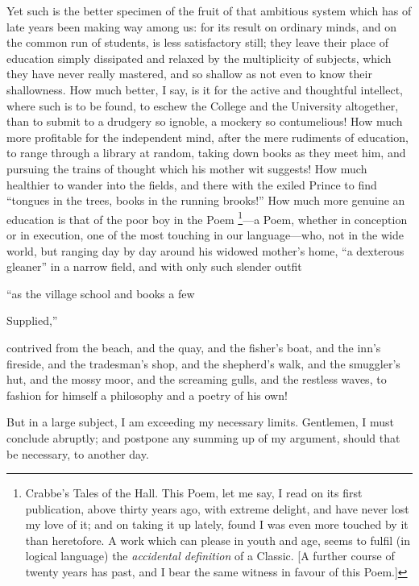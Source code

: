 Yet such is the better specimen of the fruit of that ambitious
system which has of late years been making way among us: for its
result on ordinary minds, and on the common run of students, is less
satisfactory still; they leave their place of education simply
dissipated and relaxed by the multiplicity of subjects, which they
have never really mastered, and so shallow as not even to know their
shallowness. How much better, I say, is it for the active and
thoughtful intellect, where such is to be found, to eschew the College
and the University altogether, than to submit to a drudgery so
ignoble, a mockery so contumelious! How much more profitable for the
independent mind, after the mere rudiments of education, to range
through a library at random, taking down books as they meet him,
and pursuing the trains of thought which his mother wit suggests! How
much healthier to wander into the fields, and there with the exiled
Prince to find ``tongues in the trees, books in the running
brooks!'' How much more genuine an education is that of the poor
boy in the Poem \footnote{Crabbe's Tales
of the Hall. This Poem, let me say, I read on its first publication,
above thirty years ago, with extreme delight, and have never lost my
love of it; and on taking it up lately, found I was even more touched
by it than heretofore. A work which can please in youth and age, seems
to fulfil (in logical language) the \emph{accidental definition} of a
Classic. [A further course of twenty years has past, and I bear the
same witness in favour of this Poem.]}—a Poem, whether in conception or in execution, one of the
most touching in our language—who, not in the wide world, but
ranging day by day around his widowed mother's home, ``a dexterous
gleaner'' in a narrow field, and with only such slender outfit

``as the village school and books a few

Supplied,''

contrived from the beach, and the quay, and the fisher's boat, and
the inn's fireside, and the tradesman's shop, and the shepherd's walk,
and the smuggler's hut, and the mossy moor, and the screaming gulls,
and the restless waves, to fashion for himself a philosophy and a
poetry of his own!

But in a large subject, I am exceeding my necessary limits.
Gentlemen, I must conclude abruptly; and postpone any summing up of my
argument, should that be necessary, to another day.


